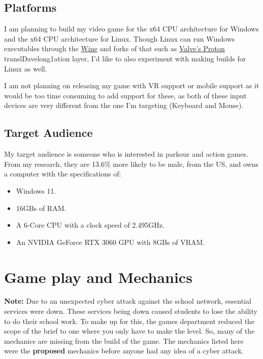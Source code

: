 \documentclass[12pt]{article}
\begin{document}
	\subsection{Platforms}
	I am planning to build my video game for the x64 CPU architecture for Windows and the x64 CPU architecture for Linux. Though Linux can run Windows executables through the \href{https://www.winehq.org}{Wine} and forks of that such as \href{https://github.com/ValveSoftware/Proton}{Valve's Proton} translDavelong1ation layer, I'd like to also experiment with making builds for Linux as well.
	
	I am not planning on releasing my game with VR support or mobile support as it would be too time consuming to add support for these, as both of these input devices are very different from the one I'm targeting (Keyboard and Mouse).
	
	\newpage
	\subsection{Target Audience}
	My target audience is someone who is interested in parkour and action games. From my research, they are 13.6\% more likely to be male, \cite{gameTreeIndustryReports} from the US, \cite{gameDiscoverCoCountryBreakdown} and owns a computer with the specifications of:
	\begin{itemize}
		\item Windows 11.
		\item 16GBs of RAM.
		\item A 6-Core CPU with a clock speed of 2.495GHz.
		\item An NVIDIA GeForce RTX 3060 GPU with 8GBs of VRAM.
	\end{itemize} \cite{steamHardwareSurvey}
	
	\section{Game play and Mechanics}
	\begin{note}
		\textbf{Note:} Due to an unexpected cyber attack against the school network, essential services were down. These services being down caused students to lose the ability to do their school work. To make up for this, the games department reduced the scope of the brief to one where you only have to make the level. So, many of the mechanics are missing from the build of the game. The mechanics listed here were the \textbf{proposed} mechanics before anyone had any idea of a cyber attack.
	\end{note}
\end{document}
